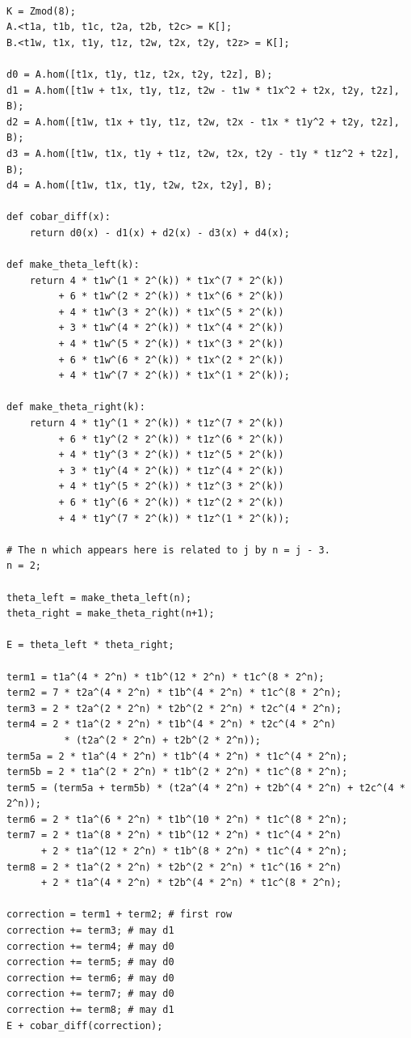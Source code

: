 \begin{verbatim}

K = Zmod(8);
A.<t1a, t1b, t1c, t2a, t2b, t2c> = K[];
B.<t1w, t1x, t1y, t1z, t2w, t2x, t2y, t2z> = K[];

d0 = A.hom([t1x, t1y, t1z, t2x, t2y, t2z], B);
d1 = A.hom([t1w + t1x, t1y, t1z, t2w - t1w * t1x^2 + t2x, t2y, t2z], B);
d2 = A.hom([t1w, t1x + t1y, t1z, t2w, t2x - t1x * t1y^2 + t2y, t2z], B);
d3 = A.hom([t1w, t1x, t1y + t1z, t2w, t2x, t2y - t1y * t1z^2 + t2z], B);
d4 = A.hom([t1w, t1x, t1y, t2w, t2x, t2y], B);

def cobar_diff(x):
    return d0(x) - d1(x) + d2(x) - d3(x) + d4(x);

def make_theta_left(k):
    return 4 * t1w^(1 * 2^(k)) * t1x^(7 * 2^(k)) 
         + 6 * t1w^(2 * 2^(k)) * t1x^(6 * 2^(k)) 
         + 4 * t1w^(3 * 2^(k)) * t1x^(5 * 2^(k)) 
         + 3 * t1w^(4 * 2^(k)) * t1x^(4 * 2^(k)) 
         + 4 * t1w^(5 * 2^(k)) * t1x^(3 * 2^(k)) 
         + 6 * t1w^(6 * 2^(k)) * t1x^(2 * 2^(k)) 
         + 4 * t1w^(7 * 2^(k)) * t1x^(1 * 2^(k));

def make_theta_right(k):
    return 4 * t1y^(1 * 2^(k)) * t1z^(7 * 2^(k)) 
         + 6 * t1y^(2 * 2^(k)) * t1z^(6 * 2^(k)) 
         + 4 * t1y^(3 * 2^(k)) * t1z^(5 * 2^(k)) 
         + 3 * t1y^(4 * 2^(k)) * t1z^(4 * 2^(k)) 
         + 4 * t1y^(5 * 2^(k)) * t1z^(3 * 2^(k)) 
         + 6 * t1y^(6 * 2^(k)) * t1z^(2 * 2^(k)) 
         + 4 * t1y^(7 * 2^(k)) * t1z^(1 * 2^(k));

# The n which appears here is related to j by n = j - 3.
n = 2;

theta_left = make_theta_left(n);
theta_right = make_theta_right(n+1);

E = theta_left * theta_right;

term1 = t1a^(4 * 2^n) * t1b^(12 * 2^n) * t1c^(8 * 2^n);
term2 = 7 * t2a^(4 * 2^n) * t1b^(4 * 2^n) * t1c^(8 * 2^n);
term3 = 2 * t2a^(2 * 2^n) * t2b^(2 * 2^n) * t2c^(4 * 2^n);
term4 = 2 * t1a^(2 * 2^n) * t1b^(4 * 2^n) * t2c^(4 * 2^n) 
          * (t2a^(2 * 2^n) + t2b^(2 * 2^n));
term5a = 2 * t1a^(4 * 2^n) * t1b^(4 * 2^n) * t1c^(4 * 2^n);
term5b = 2 * t1a^(2 * 2^n) * t1b^(2 * 2^n) * t1c^(8 * 2^n);
term5 = (term5a + term5b) * (t2a^(4 * 2^n) + t2b^(4 * 2^n) + t2c^(4 * 2^n));
term6 = 2 * t1a^(6 * 2^n) * t1b^(10 * 2^n) * t1c^(8 * 2^n);
term7 = 2 * t1a^(8 * 2^n) * t1b^(12 * 2^n) * t1c^(4 * 2^n) 
      + 2 * t1a^(12 * 2^n) * t1b^(8 * 2^n) * t1c^(4 * 2^n); 
term8 = 2 * t1a^(2 * 2^n) * t2b^(2 * 2^n) * t1c^(16 * 2^n) 
      + 2 * t1a^(4 * 2^n) * t2b^(4 * 2^n) * t1c^(8 * 2^n);

correction = term1 + term2; # first row
correction += term3; # may d1
correction += term4; # may d0
correction += term5; # may d0
correction += term6; # may d0
correction += term7; # may d0
correction += term8; # may d1
E + cobar_diff(correction);

\end{verbatim}

